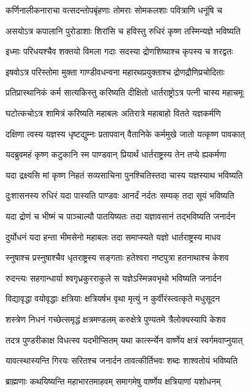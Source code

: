 \twolineshloka
{कर्णिनालीकनाराचा वत्सदन्तोपबृंहणाः}
{तोमराः सोमकलशाः पवित्राणि धनूंषि च}


\twolineshloka
{असयोऽत्र कपालानि पुरोडाशाः शिरांसि च}
{हविस्तु रुधिरं कृष्ण तस्मिन्यज्ञे भविष्यति}


\twolineshloka
{इध्माः परिधयश्चैव शक्तयो विमला गदाः}
{सदस्या द्रोणशिष्याश्च कृपस्य च शरद्वतः}


\twolineshloka
{इषवोऽत्र परिस्तोमा मुक्ता गाण्डीवधन्वना}
{महारथप्रयुक्ताश्च द्रोणद्रौणिप्रचोदिताः}


\twolineshloka
{प्रतिप्रास्थानिकं कर्म सात्यकिस्तु करिष्यति}
{दीक्षितो धार्तराष्ट्रोऽत्र पत्नी चास्य महाचमूः}


\twolineshloka
{घटोत्कचोऽत्र शामित्रं करिष्यति महाबलः}
{अतिरात्रे महाबाहो वितते यज्ञकर्मणि}


\twolineshloka
{दक्षिणा त्वस्य यज्ञस्य धृष्टद्युम्नः प्रतापवान्}
{वैतानिके कर्ममुखे जातो यत्कृष्ण पावकात्}


\twolineshloka
{यदब्रुवमहं कृष्ण कटुकानि स्म पाण्डवान्}
{प्रियार्थं धार्तराष्ट्रस्य तेन तप्ये ह्यकर्मणा}


\twolineshloka
{यदा द्रक्ष्यसि मां कृष्ण निहतं सव्यसाचिना}
{पुनश्चितिस्तदा चास्य यज्ञस्याथ भविष्यति}


\twolineshloka
{दुःशासनस्य रुधिरं यदा पास्यति पाण्डवः}
{आनर्दं नर्दतः सम्यक् तदा सूयं भविष्यति}


\twolineshloka
{यदा द्रोणं च भीष्मं च पाञ्चाल्यौ पातयिष्यतः}
{तदा यज्ञावसानं तद्भविष्यति जनार्दन}


\twolineshloka
{दुर्योधनं यदा हन्ता भीमसेनो महाबलः}
{तदा समाप्स्यते यज्ञो धार्तराष्ट्रस्य माधव}


\twolineshloka
{स्नुषाश्च प्रस्नुषाश्चैव धृतराष्ट्रस्य सङ्गताः}
{हतेश्वरा नष्टपुत्रा हतनाथाश्च केशव}


\twolineshloka
{रुदन्त्यः सहगान्धार्या श्वगृध्रकुरराकुले}
{स यज्ञेऽस्मिन्नवभृथो भविष्यति जनार्दन}


\twolineshloka
{विद्यावृद्धा वयोवृद्धाः क्षत्रियाः क्षत्रियर्षभ}
{वृथा मृत्युं न कुर्वीरंस्त्वत्कृते मधुसूदन}


\twolineshloka
{शस्त्रेण निधनं गच्छेत्समृद्धं क्षत्रमण्डलम्}
{करुक्षेत्रे पुण्यतमे त्रैलोक्यस्यापि केशव}


\twolineshloka
{तदत्र पुण्डरीकाक्ष विधत्स्व यदभीप्सितम्}
{यथा कार्त्स्न्येन वार्ष्णेय क्षत्रं स्वर्गमवाप्नुयात्}


\twolineshloka
{यावत्स्थास्यन्ति गिरयः सरितश्च जनार्दन}
{तावत्कीर्तिभवः शब्दः शाश्वतोयं भविष्यति}


\twolineshloka
{ब्राह्मणाः कथयिष्यन्ति महाभारतमाहवम्}
{समागमेषु वार्ष्णेय क्षत्रियाणां यशोधनम्}


